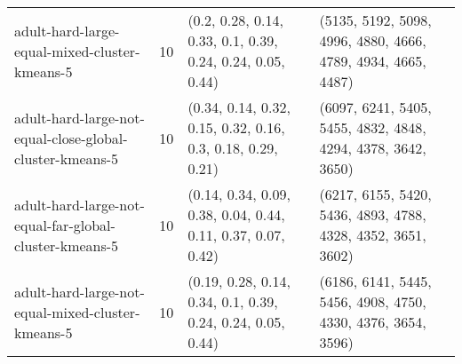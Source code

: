 \begin{longtable}{llll}
                                                                adult-hard-large-equal-mixed-cluster-kmeans-5 &             10 &                                                                                                                                                                                                                                                (0.2, 0.28, 0.14, 0.33, 0.1, 0.39, 0.24, 0.24, 0.05, 0.44) &                                                                                                                                                                                                                                              (5135, 5192, 5098, 4996, 4880, 4666, 4789, 4934, 4665, 4487) \\
                                                     adult-hard-large-not-equal-close-global-cluster-kmeans-5 &             10 &                                                                                                                                                                                                                                               (0.34, 0.14, 0.32, 0.15, 0.32, 0.16, 0.3, 0.18, 0.29, 0.21) &                                                                                                                                                                                                                                              (6097, 6241, 5405, 5455, 4832, 4848, 4294, 4378, 3642, 3650) \\
                                                       adult-hard-large-not-equal-far-global-cluster-kmeans-5 &             10 &                                                                                                                                                                                                                                              (0.14, 0.34, 0.09, 0.38, 0.04, 0.44, 0.11, 0.37, 0.07, 0.42) &                                                                                                                                                                                                                                              (6217, 6155, 5420, 5436, 4893, 4788, 4328, 4352, 3651, 3602) \\
                                                            adult-hard-large-not-equal-mixed-cluster-kmeans-5 &             10 &                                                                                                                                                                                                                                               (0.19, 0.28, 0.14, 0.34, 0.1, 0.39, 0.24, 0.24, 0.05, 0.44) &                                                                                                                                                                                                                                              (6186, 6141, 5445, 5456, 4908, 4750, 4330, 4376, 3654, 3596) \\

\end{longtable}
